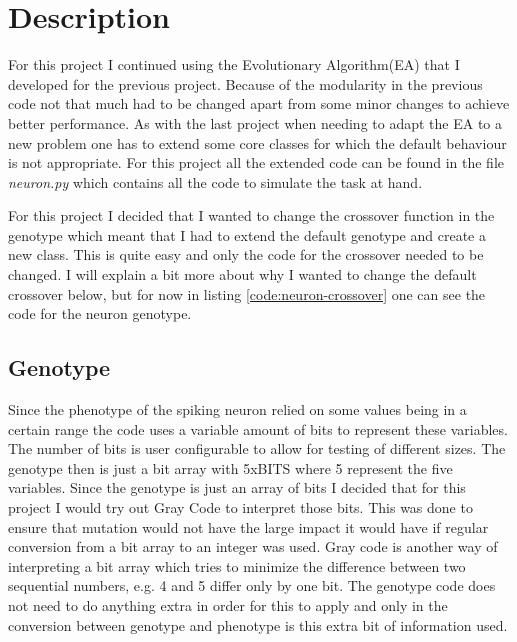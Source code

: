 \section{Description}\label{sec:description}
For this project I continued using the Evolutionary Algorithm(EA) that I
developed for the previous project. Because of the modularity in the previous
code not that much had to be changed apart from some minor changes to achieve
better performance. As with the last project when needing to adapt the EA to a
new problem one has to extend some core classes for which the default behaviour
is not appropriate. For this project all the extended code can be found in the
file \textit{neuron.py} which contains all the code to simulate the task at
hand.

For this project I decided that I wanted to change the crossover function in the
genotype which meant that I had to extend the default genotype and create a new
class. This is quite easy and only the code for the crossover needed to be
changed. I will explain a bit more about why I wanted to change the default
crossover below, but for now in listing \ref{code:neuron-crossover} one can see
the code for the neuron genotype.



\subsection{Genotype}\label{sec:genotype-description}
Since the phenotype of the spiking neuron relied on some values being in a
certain range the code uses a variable amount of bits to represent these
variables. The number of bits is user configurable to allow for testing of
different sizes. The genotype then is just a bit array with 5xBITS where 5 represent
the five variables. Since the genotype is just an array of bits I decided that
for this project I would try out Gray Code to interpret those bits. This was
done to ensure that mutation would not have the large impact it would have if
regular conversion from a bit array to an integer was used. Gray code is another
way of interpreting a bit array which tries to minimize the difference between
two sequential numbers, e.g. 4 and 5 differ only by one bit. The genotype code
does not need to do anything extra in order for this to apply and only in the
conversion between genotype and phenotype is this extra bit of information used.


